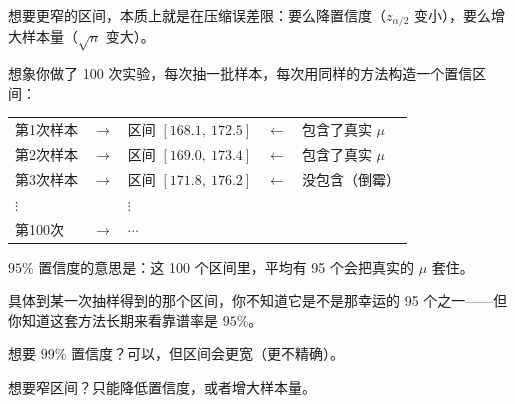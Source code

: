 \begin{dxtips}
想要更窄的区间，本质上就是在压缩误差限：要么降置信度（$z_{\alpha/2}$ 变小），要么增大样本量（$\sqrt{n}$ 变大）。
\end{dxtips}
\begin{note}[正确理解]
想象你做了 100 次实验，每次抽一批样本，每次用同样的方法构造一个置信区间：

\begin{center}
\begin{tabular}{lllll}
第1次样本 & $\to$ & 区间 $[168.1,\ 172.5]$ & $\leftarrow$ & 包含了真实 $\mu$ \\
第2次样本 & $\to$ & 区间 $[169.0,\ 173.4]$ & $\leftarrow$ & 包含了真实 $\mu$ \\
第3次样本 & $\to$ & 区间 $[171.8,\ 176.2]$ & $\leftarrow$ & 没包含（倒霉）\\
$\vdots$  &       & $\vdots$               &              & \\
第100次   & $\to$ & $\cdots$               &              &
\end{tabular}
\end{center}

$95\%$ 置信度的意思是：这 100 个区间里，平均有 95 个会把真实的 $\mu$ 套住。

具体到某一次抽样得到的那个区间，你不知道它是不是那幸运的 95 个之一——但你知道这套方法长期来看靠谱率是 $95\%$。
\end{note}

\begin{note}[可靠度和精度的取舍]
想要 $99\%$ 置信度？可以，但区间会更宽（更不精确）。

想要窄区间？只能降低置信度，或者增大样本量。
\end{note}

